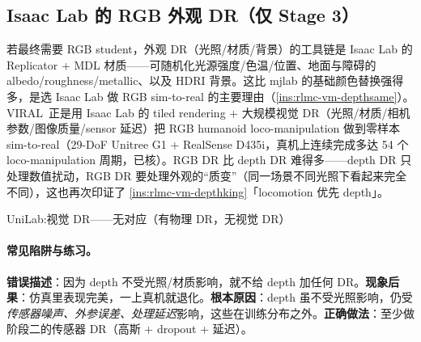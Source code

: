 \subsection{Isaac Lab 的 RGB 外观 DR（仅 Stage 3）}
\label{sec:rlmc-vm-rgbdr}

若最终需要 RGB student，外观 DR（光照/材质/背景）的工具链是 Isaac Lab 的 Replicator + MDL 材质——可随机化光源强度/色温/位置、地面与障碍的 albedo/roughness/metallic、以及 HDRI 背景。这比 mjlab 的基础颜色替换强得多，是选 Isaac Lab 做 RGB sim-to-real 的主要理由（\cref{ins:rlmc-vm-depthsame}）。VIRAL\,\cite{he2025viral} 正是用 Isaac Lab 的 tiled rendering + 大规模视觉 DR（光照/材质/相机参数/图像质量/sensor 延迟）把 RGB humanoid loco-manipulation 做到零样本 sim-to-real（29-DoF Unitree G1 + RealSense D435i，真机上连续完成多达 54 个 loco-manipulation 周期，已核）。RGB DR 比 depth DR 难得多——depth DR 只处理数值扰动，RGB DR 要处理外观的“质变”（同一场景不同光照下看起来完全不同），这也再次印证了 \cref{ins:rlmc-vm-depthking}「locomotion 优先 depth」。

\begin{codebox}[text]{UniLab:视觉 DR——无对应（有物理 DR，无视觉 DR）}
\end{codebox}

\paragraph{常见陷阱与练习。}

\begin{pitfall}
\textbf{错误描述}：因为 depth 不受光照/材质影响，就不给 depth 加任何 DR。\textbf{现象后果}：仿真里表现完美，一上真机就退化。\textbf{根本原因}：depth 虽不受光照影响，仍受\emph{传感器噪声、外参误差、处理延迟}影响，这些在训练分布之外。\textbf{正确做法}：至少做阶段二的传感器 DR（高斯 + dropout + 延迟）。
\end{pitfall}

